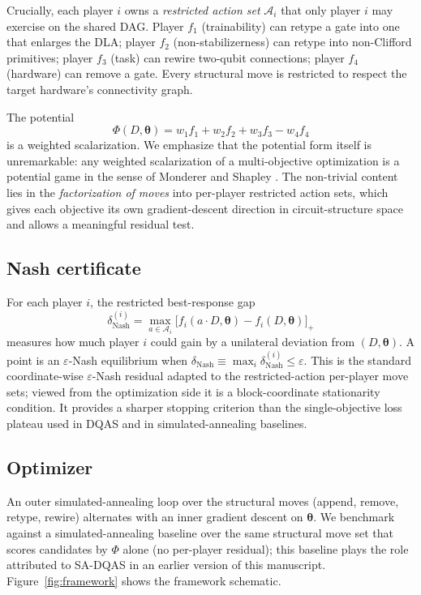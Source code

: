 \documentclass[a4paper,onecolumn,noarxiv]{quantumarticle}
\begin{document}
Crucially, each player $i$ owns a \emph{restricted action set} $\mathcal A_i$ that only player $i$ may exercise on the shared DAG. Player $f_1$ (trainability) can retype a gate into one that enlarges the DLA; player $f_2$ (non-stabilizerness) can retype into non-Clifford primitives; player $f_3$ (task) can rewire two-qubit connections; player $f_4$ (hardware) can remove a gate. Every structural move is restricted to respect the target hardware's connectivity graph.

The potential
\begin{equation}
\Phi(D,\bm\theta)=w_1 f_1+w_2 f_2+w_3 f_3-w_4 f_4
\label{eq:potential}
\end{equation}
is a weighted scalarization. We emphasize that the potential form itself is unremarkable: any weighted scalarization of a multi-objective optimization is a potential game in the sense of Monderer and Shapley \cite{monderer1996potential}. The non-trivial content lies in the \emph{factorization of moves} into per-player restricted action sets, which gives each objective its own gradient-descent direction in circuit-structure space and allows a meaningful residual test.

\subsection{Nash certificate}

For each player $i$, the restricted best-response gap
\begin{equation}
\delta^{(i)}_\text{Nash}=\max_{a\in\mathcal A_i}\bigl[f_i(a\cdot D,\bm\theta)-f_i(D,\bm\theta)\bigr]_+
\label{eq:delta}
\end{equation}
measures how much player $i$ could gain by a unilateral deviation from $(D,\bm\theta)$. A point is an $\varepsilon$-Nash equilibrium when $\delta_\text{Nash}\equiv\max_i\delta^{(i)}_\text{Nash}\le\varepsilon$. This is the standard coordinate-wise $\varepsilon$-Nash residual adapted to the restricted-action per-player move sets; viewed from the optimization side it is a block-coordinate stationarity condition. It provides a sharper stopping criterion than the single-objective loss plateau used in DQAS and in simulated-annealing baselines.

\subsection{Optimizer}

An outer simulated-annealing loop over the structural moves (append, remove, retype, rewire) alternates with an inner gradient descent on $\bm\theta$. We benchmark against a simulated-annealing baseline over the same structural move set that scores candidates by $\Phi$ alone (no per-player residual); this baseline plays the role attributed to SA-DQAS in an earlier version of this manuscript. Figure~\ref{fig:framework} shows the framework schematic.
\end{document}
